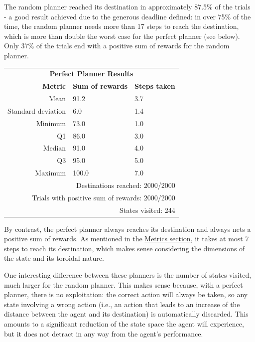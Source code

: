 \documentclass{article}
\begin{document}
The random planner reached its destination in approximately 87.5\% of the trials - a good result achieved due to the generous deadline defined: in over 75\% of the time, the random planner needs more than 17 steps to reach the destination, which is more than double the worst case for the perfect planner (see below). Only 37\% of the trials end with a positive sum of rewards for the random planner.  

\begin{center}
   \begin{tabular}{rll}
        \multicolumn{3}{c}{\textbf{Perfect Planner Results}} \\
        \textbf{Metric}     & \textbf{Sum of rewards}   & \textbf{Steps taken}\\
        Mean                & 91.2                      & 3.7\\
        Standard deviation  & 6.0                       & 1.4\\
        Minimum             & 73.0                      & 1.0\\
        Q1                  & 86.0                      & 3.0\\
        Median              & 91.0                      & 4.0\\
        Q3                  & 95.0                      & 5.0\\
        Maximum             & 100.0                     & 7.0\\
        \multicolumn{3}{r}{Destinations reached: 2000/2000}\\
        \multicolumn{3}{r}{Trials with positive sum of rewards: 2000/2000}\\
        \multicolumn{3}{r}{States visited: 244}\\
    \end{tabular}
\end{center}

By contrast, the perfect planner always reaches its destination and always nets a positive sum of rewards. As mentioned in the \hyperref[sec:metrics]{Metrics section}, it takes at most 7 steps to reach its destination, which makes sense considering the dimensions of the state and its toroidal nature.

One interesting difference between these planners is the number of states visited, much larger for the random planner. This makes sense because, with a perfect planner, there is no exploitation: the correct action will always be taken, so any state involving a wrong action (i.e., an action that leads to an increase of the distance between the agent and its destination) is automatically discarded. This amounts to a significant reduction of the state space the agent will experience, but it does not detract in any way from the agent's performance. 
\end{document}
